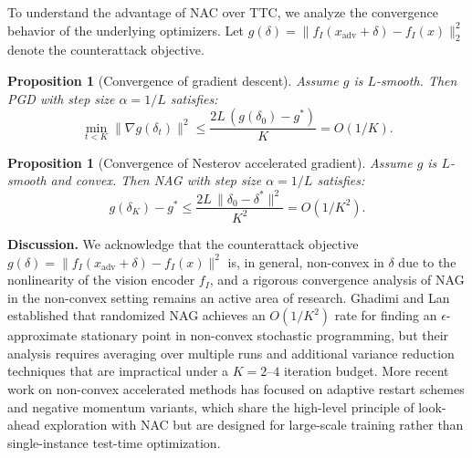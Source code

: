 \documentclass[pdflatex,sn-basic,Numbered]{sn-jnl}
\theoremstyle{thmstyleone}
\newtheorem{proposition}[theorem]{Proposition}
\theoremstyle{thmstyletwo}
\theoremstyle{thmstylethree}
\begin{document}
To understand the advantage of NAC over TTC, we analyze the convergence behavior of the underlying optimizers. Let $g(\delta) = \|f_I(x_{\text{adv}} + \delta) - f_I(x)\|^2_2$ denote the counterattack objective.

\begin{proposition}[Convergence of gradient descent]\label{prop:pgd}
Assume $g$ is $L$-smooth. Then PGD with step size $\alpha = 1/L$ satisfies:
\begin{equation}
\min_{t < K} \|\nabla g(\delta_t)\|^2 \leq \frac{2L\,(g(\delta_0) - g^*)}{K} = O(1/K).
\end{equation}
\end{proposition}

\begin{proposition}[Convergence of Nesterov accelerated gradient]\label{prop:nag}
Assume $g$ is $L$-smooth and convex. Then NAG with step size $\alpha = 1/L$ satisfies:
\begin{equation}
g(\delta_K) - g^* \leq \frac{2L\,\|\delta_0 - \delta^*\|^2}{K^2} = O(1/K^2).
\end{equation}
\end{proposition}

\textbf{Discussion.} We acknowledge that the counterattack objective $g(\delta) = \|f_I(x_{\text{adv}} + \delta) - f_I(x)\|^2$ is, in general, non-convex in $\delta$ due to the nonlinearity of the vision encoder $f_I$, and a rigorous convergence analysis of NAG in the non-convex setting remains an active area of research. Ghadimi and Lan~\cite{ghadimi2016accelerated} established that randomized NAG achieves an $O(1/K^2)$ rate for finding an $\epsilon$-approximate stationary point in non-convex stochastic programming, but their analysis requires averaging over multiple runs and additional variance reduction techniques that are impractical under a $K=2$--$4$ iteration budget. More recent work on non-convex accelerated methods has focused on adaptive restart schemes and negative momentum variants, which share the high-level principle of look-ahead exploration with NAC but are designed for large-scale training rather than single-instance test-time optimization.
\end{document}
